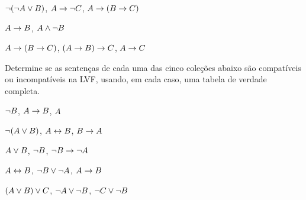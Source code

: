 \begin{earg}
\item $\neg(\neg A \vee B) $, $A \rightarrow \neg C$, $A \rightarrow (B \rightarrow C)$\vspace{.5ex} %

% 
%


\item $A \rightarrow B$, $A \wedge \neg B$\vspace{.5ex} %

\item $A \rightarrow (B \rightarrow C)$, $(A \rightarrow B) \rightarrow C$, $A \rightarrow C$\vspace{.5ex} %

\end{earg}

\noindent\problempart
\label{pr.TT.satisfiable3}
Determine se as sentenças de cada uma das cinco coleções abaixo são  compatíveis ou incompatíveis na LVF, usando, em cada caso, uma tabela de verdade completa.
\begin{earg}
\item $\neg B$, $A \rightarrow B$, $A$ \vspace{.5ex}%
\item $\neg(A \vee B)$, $A \leftrightarrow B$, $B \rightarrow A$\vspace{.5ex} %
\item $A \vee B$, $\neg B$, $\neg B \rightarrow \neg A$\vspace{.5ex} %
\item $A \leftrightarrow B$, $\neg B \vee \neg A$, $A \rightarrow B$\vspace{.5ex} %
\item $(A \vee B) \vee C$, $\neg A \vee \neg B$, $\neg C \vee \neg B$\vspace{.5ex} %
\end{earg}




